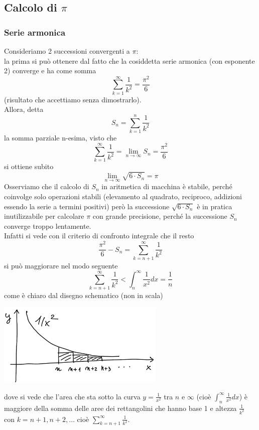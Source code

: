 \documentclass[12pt]{article}
\begin{document}
\subsection{Calcolo di $\pi$}
\subsubsection{Serie armonica}
Consideriamo 2 successioni convergenti a $\pi$:\\
la prima si può ottenere dal fatto che la cosiddetta serie armonica (con esponente 2) converge e ha come somma
\[ \sum_{k=1}^\infty \frac{1}{k^2} = \frac{\pi^2}{6} \]
(risultato che accettiamo senza dimostrarlo).\\
Allora, detta \[S_n = \sum_{k=1}^n \frac{1}{k^2}\] la somma parziale n-esima, visto che 
\[ \sum_{k=1}^\infty \frac{1}{k^2} = \lim_{n \to \infty} S_n = \frac{\pi^2}{6} \] si ottiene subito \[\lim_{n \to \infty} \sqrt{6\cdot S_n} = \pi \]
Osserviamo che il calcolo di $S_n$ in aritmetica di macchina è stabile, perché coinvolge solo operazioni stabili (elevamento al quadrato, reciproco, addizioni essendo la serie a termini positivi) però la successione $\sqrt{6\cdot S_n}$ è
in pratica inutilizzabile per calcolare $\pi$ con grande precisione, perché la successione $S_n$ converge troppo lentamente.\\
Infatti si vede con il criterio di confronto integrale che il resto 
\[ \frac{\pi^2}{6} - S_n = \sum\limits_{k=n+1}^\infty \frac{1}{k^2} \] 
si può maggiorare nel modo seguente
\[ \sum_{k=n+1}^\infty \frac{1}{k^2} < \int_n^\infty \frac{1}{x^2} dx = \frac{1}{n} \]
come è chiaro dal disegno schematico (non in scala)\\
\begin{center}
    \includegraphics[width=0.6\textwidth]{img13}
\end{center}
dove si vede che l'area che sta sotto la curva $y= \frac{1}{x^2}$ tra $n$ e $\infty$ (cioè $\int_n^\infty \frac{1}{x^2}dx$) è maggiore della somma delle aree dei rettangolini che hanno base 1 e altezza $\frac{1}{k^2}$ con $k = n+1, n+2, \dotsc$ cioè $\sum_{k=n+1}^\infty \frac{1}{k^2}$. \\
\end{document}
